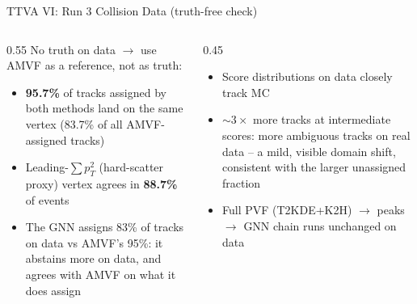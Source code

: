 \documentclass[xcolor=table,aspectratio=169]{beamer}
\begin{document}
\begin{frame}{TTVA VI: Run 3 Collision Data (truth-free check)}
    \begin{columns}[c]
        \begin{column}{0.55\linewidth}
            No truth on data \(\to\) use AMVF as a reference, not as truth:
            \begin{itemize}
                \setlength\itemsep{0.5em}
                \item \textbf{95.7\%} of tracks assigned by both methods land on the same vertex
                (83.7\% of all AMVF-assigned tracks)
                \item Leading-\(\sum p_T^2\) (hard-scatter proxy) vertex agrees in \textbf{88.7\%} of events
                \item The GNN assigns 83\% of tracks on data vs AMVF's 95\%: it abstains more on data, and agrees with AMVF on what it does assign
            \end{itemize}
        \end{column}
        \begin{column}{0.45\linewidth}
            \begin{itemize}
                \setlength\itemsep{0.5em}
                \item Score distributions on data closely track MC
                \item \(\sim3\times\) more tracks at intermediate scores: more ambiguous tracks on real data
                -- a mild, visible domain shift, consistent with the larger unassigned fraction
                \item Full PVF (T2KDE+K2H) \(\to\) peaks \(\to\) GNN chain runs unchanged on data
            \end{itemize}
        \end{column}
    \end{columns}
\end{frame}
\end{document}
